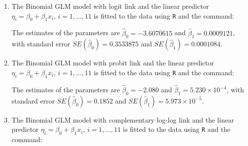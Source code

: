 \begin{solution}{2.9}
\begin{enumerate}
\item The Binomial GLM model with logit link and the linear predictor $\eta_{i}=\beta_{0}+\beta_{1}x_{i}$, $i=1,...,11$ is fitted to the data using \texttt{R} and the command:
\begin{knitrout}
\color{fgcolor}\begin{kframe}
\begin{alltt}
\hlstd{(}\hlopt{-}\hlopt{~}
\end{alltt}
\end{kframe}
\end{knitrout}

The estimates of the parameters are $\hat{\beta}_{0}=-3.6070615$ and $\hat{\beta}_{1}=0.0009121$, with standard error $SE(\hat{\beta}_{0})=0.3533875$ and $SE(\hat{\beta}_{1})=0.0001084$.

\item The Binomial GLM model with probit link and the linear predictor $\eta_{i}=\beta_{0}+\beta_{1}x_{i}$, $i=1,...,11$ is fitted to the data using \texttt{R} and the command:
\begin{knitrout}
\color{fgcolor}\begin{kframe}
\begin{alltt}
\hlstd{(}\hlopt{-}\hlopt{~}\hlstd{=}\hlstd{(}
\end{alltt}
\end{kframe}
\end{knitrout}

The estimates of the parameters are $\hat{\beta}_{0}=-2.080$ and $\hat{\beta}_{1}=5.230\times10^{-4}$, with standard error $SE(\hat{\beta}_{0})=0.1852$ and $SE(\hat{\beta}_{1})=5.973\times10^{-5}$.

\item The Binomial GLM model with complementary log-log link and the linear predictor $\eta_{i}=\beta_{0}+\beta_{1}x_{i}$, $i=1,...,11$ is fitted to the data using \texttt{R} and the command:
\begin{knitrout}
\color{fgcolor}\begin{kframe}
\begin{alltt}
\hlstd{(}\hlopt{-}\hlopt{~}\hlstd{=}\hlstd{(}
\end{alltt}
\end{kframe}
\end{knitrout}


\end{enumerate}
\end{solution}
